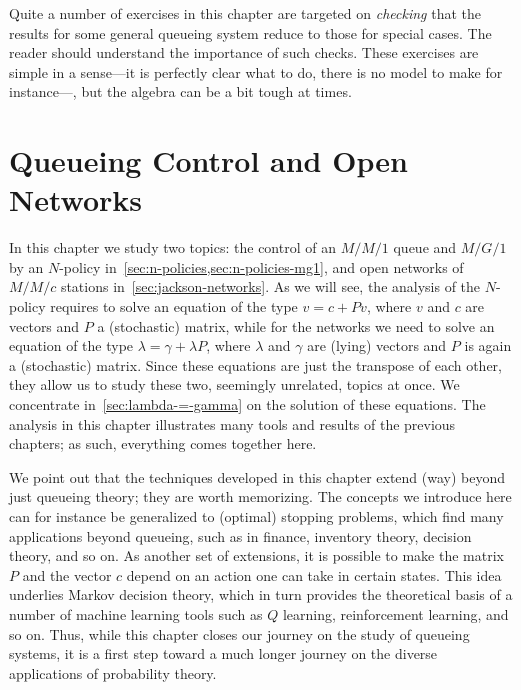 Quite a number of exercises in this chapter are targeted on \emph{checking} that the results for some general queueing system reduce to those for special cases.
The reader should understand the importance of such checks.
These exercises are simple in a sense---it is perfectly clear what to do, there is no model to make for instance---, but the algebra can be a bit  tough at times.









\chapter{Queueing Control and Open Networks}
\label{cha:queu-contr-open}

In this chapter we study two topics: the control of an $M/M/1$ queue and $M/G/1$ by an $N$-policy in~\cref{sec:n-policies,sec:n-policies-mg1}, and open networks of $M/M/c$ stations in~\cref{sec:jackson-networks}.
As we will see, the analysis of the $N$-policy requires to solve an equation of the type $v = c + P v$, where $v$ and $c$ are vectors and $P$ a (stochastic) matrix, while for the networks we need to solve an equation of the type $\lambda = \gamma + \lambda P$, where $\lambda$ and $\gamma$ are (lying) vectors and $P$ is again a (stochastic) matrix.
Since these equations are just the transpose of each other, they allow us to study these two, seemingly unrelated, topics at once.
We concentrate in~\cref{sec:lambda-=-gamma} on the solution of these equations.
The analysis in this chapter illustrates many tools and results of the previous chapters; as such, everything comes together here.

We point out that the techniques developed in this chapter extend (way) beyond just queueing theory; they are worth memorizing.
The concepts we introduce here can for instance be generalized to (optimal) stopping problems, which find many applications beyond queueing, such as in finance, inventory theory, decision theory, and so on.
As another set of extensions, it is possible to make the matrix $P$ and the vector $c$ depend on an action one can take in certain states.
This idea underlies Markov decision theory, which in turn provides the theoretical basis of a number of machine learning tools such as $Q$ learning, reinforcement learning, and so on.
Thus, while this chapter closes our journey on the study of queueing systems, it is a first step toward a much longer journey on the diverse applications of probability theory.



